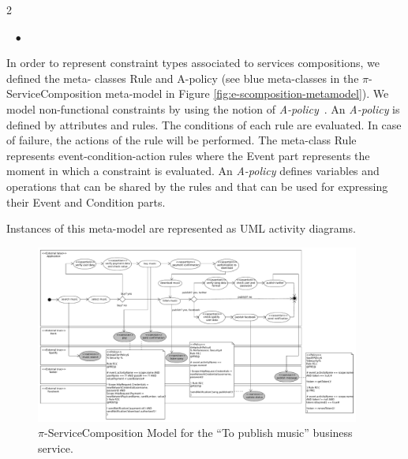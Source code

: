 \documentclass[12pt,twoside]{article}
\theoremstyle{plain}
\theoremstyle{plain}
\newenvironment{itemizedTrivlist}{\begin{list}{\rm ~\hspace{2mm} $\bullet$\ }
                                         {\setlength{\leftmargin}{0pt}
                                          \setlength{\rightmargin}{0pt}
                                          \setlength{\itemindent}{12pt}
                                          \setlength{\listparindent}{0pt}}}
                            {\end{list}}
\begin{document}
\begin{multicols}{2}
\begin{itemizedTrivlist}
\item In order to represent constraint types associated to services compositions, we defined the me\-ta- classes {\sc Rule} and {\sc A-policy} (see blue meta-classes in the $\pi$-Serv\-ice\-Com\-po\-si\-tion meta-model in Figure \ref{fig:e-scomposition-metamodel}).
We model non-func\-tion\-al constraints by using the notion of {\em A-policy}~\cite{Espinosa-Oviedo2011a,CIC:eovszmc09c}.
An {\em A-policy} is defined by attributes and rules.
The conditions of each rule are evaluated.
In case of failure, the actions of the rule will be performed.
The meta-class {\sc Rule} represents event-condition-action rules where the {\sc Event} part represents the moment in which a constraint  is evaluated.
An {\em A-policy} defines variables and operations that can be shared by the rules and that can be used for expressing their Event and Condition parts.
\end{itemizedTrivlist}
Instances of this meta-model are represented as UML activity diagrams.
\begin{figure}
\centering
\includegraphics[width=0.95\textwidth]{piServiceComposition-toPublishMusic}
\caption{$\pi$-ServiceComposition Model for the ``To publish
music'' business service.}
\label{fig:servicecompositionmodel}
\end{figure}


\end{multicols}
\end{document}
